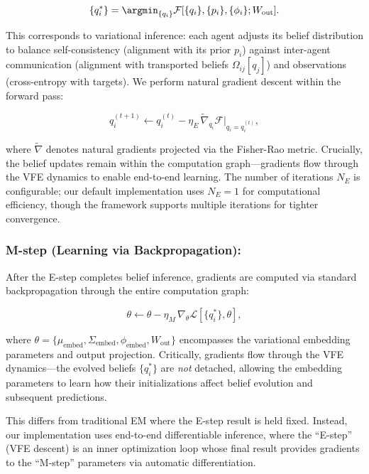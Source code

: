 \documentclass[twoside,11pt]{article}
\begin{document}
\begin{equation}
\{q_i^*\} = \argmin_{\{q_i\}} \mathcal{F}[\{q_i\}, \{p_i\}, \{\phi_i\}; W_{\text{out}}].
\label{eq:e_step}
\end{equation}

This corresponds to variational inference: each agent adjusts its belief distribution to balance self-consistency (alignment with its prior $p_i$) against inter-agent communication (alignment with transported beliefs $\Omega_{ij}[q_j]$) and observations (cross-entropy with targets). We perform natural gradient descent within the forward pass:

\begin{equation}
q_i^{(t+1)} \leftarrow q_i^{(t)} - \eta_E \, \tilde{\nabla}_{q_i} \mathcal{F}|_{q_i = q_i^{(t)}},
\end{equation}

where $\tilde{\nabla}$ denotes natural gradients projected via the Fisher-Rao metric. Crucially, the belief updates remain within the computation graph---gradients flow through the VFE dynamics to enable end-to-end learning. The number of iterations $N_E$ is configurable; our default implementation uses $N_E = 1$ for computational efficiency, though the framework supports multiple iterations for tighter convergence.

\subsubsection{M-step (Learning via Backpropagation):}

After the E-step completes belief inference, gradients are computed via standard backpropagation through the entire computation graph:

\begin{equation}
\theta \leftarrow \theta - \eta_M \, \nabla_{\theta} \mathcal{L}[\{q_i^*\}, \theta],
\label{eq:m_step}
\end{equation}

where $\theta = \{\mu_{\text{embed}}, \Sigma_{\text{embed}}, \phi_{\text{embed}}, W_{\text{out}}\}$ encompasses the variational embedding parameters and output projection. Critically, gradients flow through the VFE dynamics---the evolved beliefs $\{q_i^*\}$ are \emph{not} detached, allowing the embedding parameters to learn how their initializations affect belief evolution and subsequent predictions.

This differs from traditional EM where the E-step result is held fixed. Instead, our implementation uses end-to-end differentiable inference, where the ``E-step'' (VFE descent) is an inner optimization loop whose final result provides gradients to the ``M-step'' parameters via automatic differentiation.
\end{document}
